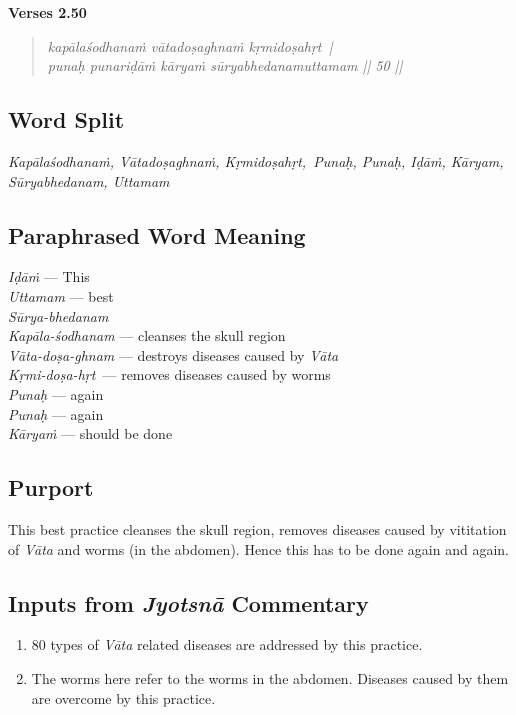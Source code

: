 \noindent \textbf{Verses 2.50}

\begin{verse}
\textit{kapālaśodhanaṁ vātadoṣaghnaṁ kṛmidoṣahṛt |\\
punaḥ punariḍāṁ kāryaṁ sūryabhedanamuttamam || 50 ||}
\end{verse}

\subsection*{Word Split}


\textit{Kapālaśodhanaṁ, Vātadoṣaghnaṁ, Kṛmidoṣahṛt, Punaḥ, Punaḥ, Iḍāṁ, Kāryam, Sūryabhedanam, Uttamam}

\subsection*{Paraphrased Word Meaning}


\begin{multicols}{2}
\textit{Iḍāṁ} --- This\\
\textit{Uttamam} --- best\\
\textit{Sūrya-bhedanam} \\
\textit{Kapāla-śodhanam} --- cleanses the skull region\\
\textit{Vāta-doṣa-ghnam} --- destroys diseases caused by \textit{Vāta}\\
\textit{Kṛmi-doṣa-hṛt }---  removes diseases caused by worms \\
\textit{Punaḥ} --- again \\
\textit{Punaḥ} --- again \\
\textit{Kāryaṁ} --- should be done
\end{multicols}

\subsection*{Purport}

This best practice cleanses the skull region, removes diseases caused by vititation of \textit{Vāta} and worms (in the abdomen). Hence this has to be done again and again.

\subsection*{Inputs from \textit{Jyotsnā} Commentary}

\begin{enumerate}
\itemsep=0pt
\item 80 types of \textit{Vāta} related diseases are addressed by this practice. 
\item The worms here refer to the worms in the abdomen. Diseases caused by them are overcome by this practice.
\end{enumerate}

